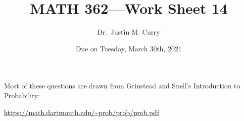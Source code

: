 \documentclass[addpoints,12pt]{exam}
\title{\vspace{-1in} MATH 362---Work Sheet 14}
\date{Due on Tuesday, March 30th, 2021}
\author{Dr.~Justin M. Curry}
\begin{document}
\maketitle




Most of these questions are drawn from Grinstead and Snell's Introduction to Probability:

\url{https://math.dartmouth.edu/~prob/prob/prob.pdf}
\end{document}
